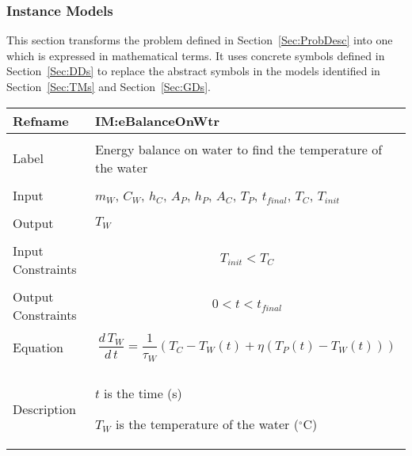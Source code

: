 \documentclass[12pt]{article}
\begin{document}
\subsubsection{Instance Models}
\label{Sec:IMs}
This section transforms the problem defined in Section~\ref{Sec:ProbDesc} into one which is expressed in mathematical terms. It uses concrete symbols defined in Section~\ref{Sec:DDs} to replace the abstract symbols in the models identified in Section~\ref{Sec:TMs} and Section~\ref{Sec:GDs}.
~\newline
\noindent \begin{minipage}{\textwidth}
\begin{tabular}{p{} p{}}
\toprule \textbf{Refname} & \textbf{IM:eBalanceOnWtr}
\label{IM:eBalanceOnWtr}
\\ \midrule \\
Label & Energy balance on water to find the temperature of the water
\\ \midrule \\
Input & ${m_{W}}$, ${C_{W}}$, ${h_{C}}$, ${A_{P}}$, ${h_{P}}$, ${A_{C}}$, ${T_{P}}$, ${t_{final}}$, ${T_{C}}$, ${T_{init}}$
\\ \midrule \\
Output & ${T_{W}}$
\\ \midrule \\
Input Constraints & \begin{dmath}
                    {T_{init}}<{T_{C}}
                    \end{dmath}
\\ \midrule \\
Output Constraints & \begin{dmath}
                     0<t<{t_{final}}
                     \end{dmath}
\\ \midrule \\
Equation & \begin{dmath}
           \frac{d\,{T_{W}}}{d\,t}=\frac{1}{{τ_{W}}} \left({T_{C}}-{T_{W}}\left(t\right)+η \left({T_{P}}\left(t\right)-{T_{W}}\left(t\right)\right)\right)
           \end{dmath}
\\ \midrule \\
Description & \begin{symbDescription}
              \item{$t$ is the time (s)}
              \item{${T_{W}}$ is the temperature of the water (${}^{\circ}$C)}

\end{symbDescription}
\end{tabular}
\end{minipage}
\end{document}
